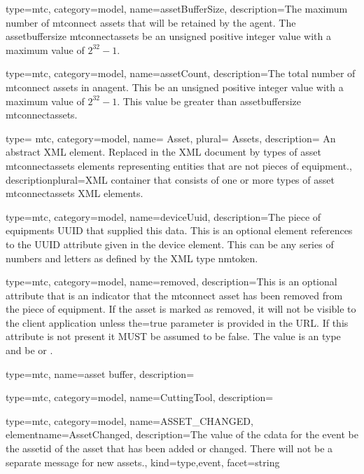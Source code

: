 {
  type=mtc,
  category=model,
  name={assetBufferSize},
  description={The maximum number of \glspl{mtconnect asset} that will be retained by the \gls{agent}. The \gls{assetbuffersize mtconnectassets} \MUST be an unsigned positive integer value with a maximum value of $2^{32}-1$. }
}


{
  type=mtc,
  category=model,
  name={assetCount},
  description={The total number of \glspl{mtconnect asset} in an\gls{agent}. This \MUST be an unsigned positive integer value with a maximum value of $2^{32}-1$. This value \MUSTNOT be greater than \gls{assetbuffersize mtconnectassets}.}
}


{
  type= mtc,
  category=model,
  name= {Asset},
  plural= {Assets},
  description= {An abstract XML element. Replaced in the XML document by types of \gls{asset mtconnectassets} elements representing entities that are not pieces of equipment.},
  descriptionplural={XML container that consists of one or more types of \gls{asset mtconnectassets} XML elements. }
}


{
  type=mtc,
  category=model,
  name={deviceUuid},
  description={The piece of equipments UUID that supplied this data. This is an optional element references to the UUID attribute given in the \gls{device} element. This can be any series of numbers and letters as defined by the XML type \gls{nmtoken}.}
}


{
  type=mtc,
  category=model,
  name={removed},
  description={This is an optional attribute that is an indicator that the \gls{mtconnect asset} has been removed from the piece of equipment. If the \gls{asset} is marked as removed,
  it will not be visible to the client application unless the=true parameter is provided in the URL. If this attribute is not present it MUST be assumed to be false. The value is an  type and \MUST be  or .}
}


{
  type=mtc,
  name={asset buffer},
  description={}
}


{
  type=mtc,
  category=model,
  name={CuttingTool},
  description={}
}


{
  type=mtc,
  category=model,
  name={ASSET\_CHANGED},
  elementname={AssetChanged},
  description={The value of the \gls{cdata} for the event \MUST be the \gls{assetid} of the asset that has been added or changed. There will not be a separate message for new assets.},
  kind={type,event},
  facet={\gls{string}}
}


